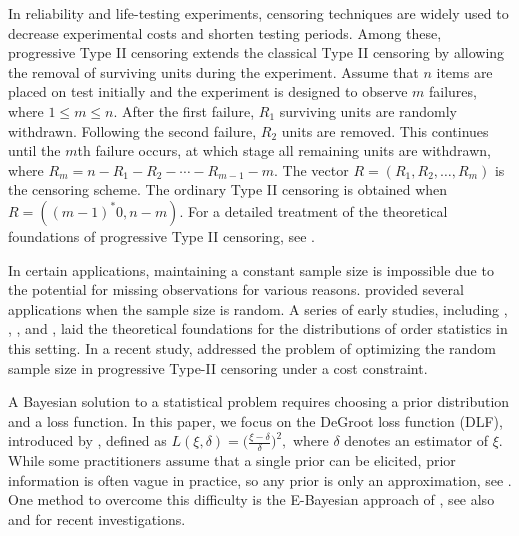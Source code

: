 \documentclass[twoside]{article}
\begin{document}
In reliability and life-testing experiments, censoring techniques are widely used to decrease experimental costs and shorten testing periods. Among these, progressive Type II censoring extends the classical Type II censoring by allowing the removal of surviving units during the experiment. 
Assume that $n$ items are placed on test initially and the experiment is designed to observe $m$ failures, where $1\leq m\leq n$. After the first failure, $R_1$ surviving units are randomly withdrawn. Following the second failure, $R_2$ units are removed. This continues until the $m$th failure occurs, at which stage all remaining units are withdrawn, where $R_m=n-R_1-R_2-\cdots-R_{m-1}-m$. The vector $R=(R_1,R_2,\ldots,R_m)$ is the censoring scheme. The ordinary Type II censoring is obtained when $R=((m-1)^*0,n-m)$. 
For a detailed treatment of the theoretical foundations of progressive Type II censoring, see \cite{Balakrishnan:Aggarwala:2000}. %

In certain applications, maintaining a constant sample size is impossible due to the potential for missing observations for various reasons. 
\cite{Srivastava:1973} provided several applications when the sample size is random. %
A series of early studies, including \cite{Raghunandanan:Patil:1972}, \cite{Buhrman:1973}, \cite{Consul:1984}, and \cite{Gupta:Gupta:1984}, laid the theoretical foundations for the distributions of order statistics in this setting. 
In a recent study, \cite{Basiri:Asgharzadeh:2021} addressed the problem of optimizing the random sample size in progressive Type-II censoring under a cost constraint.

A Bayesian solution to a statistical problem requires choosing a prior distribution and a loss function. In this paper, we focus on the DeGroot loss function (DLF), introduced by \cite{DeGroot:1970}, defined as
$	\displaystyle L(\xi,\delta)= \big(\frac{\xi-\delta}{\delta}\big)^2,$
where $\delta$ denotes an estimator of $\xi$. While some practitioners assume that a single prior can be elicited, prior information is often vague in practice, so any prior is only an approximation, see \cite{Alhamaidah:et:al:2023}. One method to overcome this difficulty is the E-Bayesian approach of \cite{Han:1997},  see also \cite{Alhamaidah:et:al:2023} and \cite{Ghasabani:et:al:2026} for recent investigations. 
\end{document}
